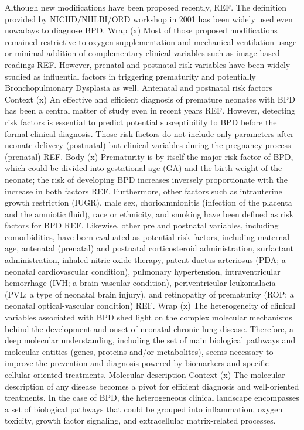 Although new modifications have been proposed recently, REF. The definition provided by NICHD/NHLBI/ORD workshop in 2001 has been widely used even nowadays to diagnose BPD.
Wrap (x)
Most of those proposed modifications remained restrictive to oxygen supplementation and mechanical ventilation usage or minimal addition of complementary clinical variables such as image-based readings REF. However, prenatal and postnatal risk variables have been widely studied as influential factors in triggering prematurity and potentially Bronchopulmonary Dysplasia as well.
Antenatal and postnatal risk factors
Context (x)
An effective and efficient diagnosis of premature neonates with BPD has been a central matter of study even in recent years REF. However, detecting risk factors is essential to predict potential susceptibility to BPD before the formal clinical diagnosis. Those risk factors do not include only parameters after neonate delivery (postnatal) but clinical variables during the pregnancy process (prenatal) REF.
Body (x)
Prematurity is by itself the major risk factor of BPD, which could be divided into gestational age (GA) and the birth weight of the neonate; the risk of developing BPD increases inversely proportionate with the increase in both factors REF. Furthermore, other factors such as intrauterine growth restriction (IUGR), male sex, chorioamnionitis (infection of the placenta and the amniotic fluid), race or ethnicity, and smoking have been defined as risk factors for BPD REF. Likewise, other pre and postnatal variables, including comorbidities, have been evaluated as potential risk factors, including maternal age, antenatal (prenatal) and postnatal corticosteroid administration, surfactant administration, inhaled nitric oxide therapy, patent ductus arteriosus (PDA; a neonatal cardiovascular condition), pulmonary hypertension, intraventricular hemorrhage (IVH; a brain-vascular condition), periventricular leukomalacia (PVL; a type of neonatal brain injury), and retinopathy of prematurity (ROP; a neonatal optical-vascular condition) REF.
Wrap (x)
The heterogeneity of clinical variables associated with BPD shed light on the complex molecular mechanisms behind the development and onset of neonatal chronic lung disease. Therefore, a deep molecular understanding, including the set of main biological pathways and molecular entities (genes, proteins and/or metabolites), seems necessary to improve the prevention and diagnosis powered by biomarkers and specific cellular-oriented treatments.
Molecular description
Context (x)
The molecular description of any disease becomes a pivot for efficient diagnosis and well-oriented treatments. In the case of BPD, the heterogeneous clinical landscape encompasses a set of biological pathways that could be grouped into inflammation, oxygen toxicity, growth factor signaling, and extracellular matrix-related processes. 
